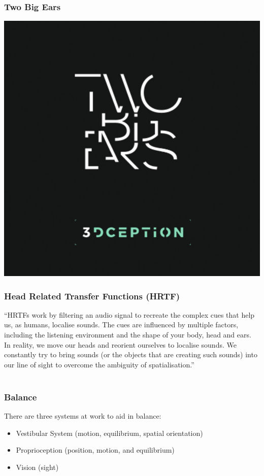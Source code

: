 \begin{frame}
	\frametitle{Two Big Ears}
	
	\begin{center}
		\href{http://www.twobigears.com/index.php}{\includegraphics[scale=.4]{assets/twobigears} }
	\end{center}
	
\end{frame}

\begin{frame}
	\frametitle{ Head Related Transfer Functions (HRTF)}
``HRTFs work by filtering an audio signal to recreate the complex cues that help us, as humans, localise sounds. The cues are influenced by
multiple factors, including the listening environment and the shape of your body, head and ears. In reality, we
move our heads and reorient ourselves to localise sounds. We constantly try to bring sounds (or the objects that
are creating such sounds) into our line of sight to overcome the ambiguity of spatialisation.'' \\~\\

\end{frame}

\begin{frame}
	\frametitle{Balance}
	There are three systems at work to aid in balance:
	
	\begin{itemize}
		\item Vestibular System (motion, equilibrium, spatial orientation)
		\item Proprioception (position, motion, and equilibrium)
		\item Vision (sight)
	\end{itemize}
			
\end{frame}

